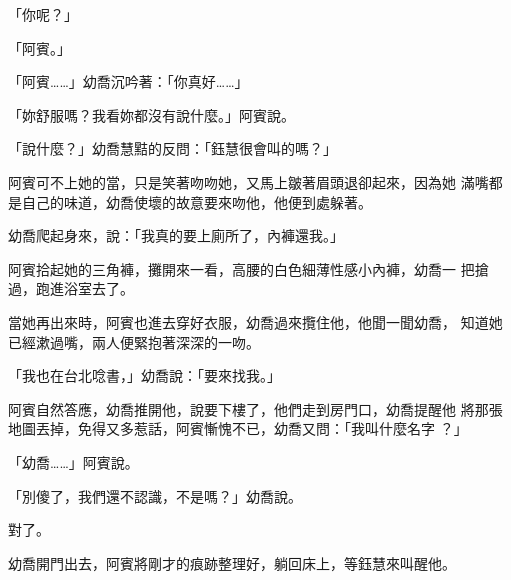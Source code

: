 「你呢？」

「阿賓。」

「阿賓……」幼喬沉吟著：「你真好……」

「妳舒服嗎？我看妳都沒有說什麼。」阿賓說。

「說什麼？」幼喬慧黠的反問：「鈺慧很會叫的嗎？」

阿賓可不上她的當，只是笑著吻吻她，又馬上皺著眉頭退卻起來，因為她
滿嘴都是自己的味道，幼喬使壞的故意要來吻他，他便到處躲著。

幼喬爬起身來，說：「我真的要上廁所了，內褲還我。」

阿賓拾起她的三角褲，攤開來一看，高腰的白色細薄性感小內褲，幼喬一
把搶過，跑進浴室去了。

當她再出來時，阿賓也進去穿好衣服，幼喬過來攬住他，他聞一聞幼喬，
知道她已經漱過嘴，兩人便緊抱著深深的一吻。

「我也在台北唸書，」幼喬說：「要來找我。」

阿賓自然答應，幼喬推開他，說要下樓了，他們走到房門口，幼喬提醒他
將那張地圖丟掉，免得又多惹話，阿賓慚愧不已，幼喬又問：「我叫什麼名字
？」

「幼喬……」阿賓說。

「別傻了，我們還不認識，不是嗎？」幼喬說。

對了。

幼喬開門出去，阿賓將剛才的痕跡整理好，躺回床上，等鈺慧來叫醒他。










